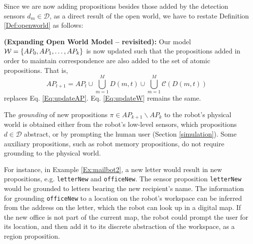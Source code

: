 Since we are now adding propositions besides those added by the detection sensors $d_m \in \mathcal{D}$, as a direct result of the open world, we have to restate Definition \ref{Def:openworld} as follows:

\begin{myDefinition}\label{Def:openworld2}
	\textbf{(Expanding Open World Model -- revisited):} Our model $\mathcal{W} = \left\{ AP_0, AP_1, \ldots, AP_k \right\}$ is now updated such that the propositions added in order to maintain correspondence are also added to the set of atomic propositions. That is, 
	\begin{equation}\label{Eq:updateAP2}
		AP_{t+1} = AP_t \cup \bigcup_{m=1}^{M}D(m, t) \cup \bigcup_{m=1}^{M}\mathcal{C}(D(m, t))
	\end{equation}
	replaces Eq. \eqref{Eq:updateAP}. Eq. \eqref{Eq:updateW} remains the same.
\end{myDefinition}

\begin{myAssumption}\label{Ass:grounding}
	The \emph{grounding} \cite{Grounding2013} of new propositions $\pi \in AP_{k+1} \backslash AP_k$ to the robot's physical world is obtained either from the robot's low-level sensors, which propositions $d \in \mathcal{D}$ abstract, or by prompting the human user (Section \ref{simulation}).
Some auxiliary propositions, such as robot memory propositions, do not require grounding to the physical world.
\end{myAssumption}

For instance, in Example \ref{Ex:mailbot2}, a new letter would result in new propositions, e.g. \texttt{letterNew} and \texttt{officeNew}. The sensor proposition \texttt{letterNew} would be grounded to letters bearing the new recipient's name. The information for grounding \texttt{officeNew} to a location on the robot's workspace can be inferred from the address on the letter, which the robot can look up in a digital map. If the new office is not part of the current map, the robot could prompt the user for its location, and then add it to its discrete abstraction of the workspace, as a region proposition.

